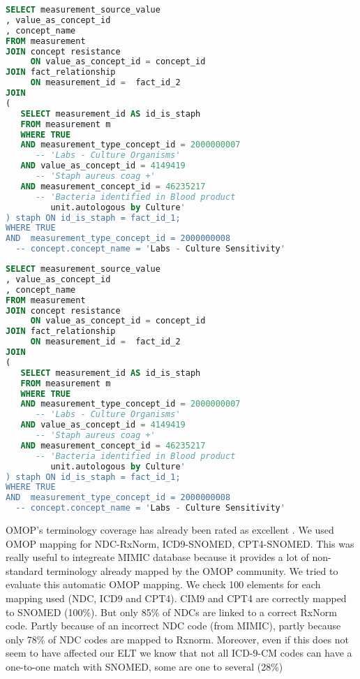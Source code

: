\begin{lstlisting}[language=sql,basicstyle=\scriptsize,caption=Original table microbiology SQL query,label={lst:original}]
SELECT measurement_source_value
, value_as_concept_id
, concept_name
FROM measurement
JOIN concept resistance 
     ON value_as_concept_id = concept_id
JOIN fact_relationship 
     ON measurement_id =  fact_id_2
JOIN
(
   SELECT measurement_id AS id_is_staph
   FROM measurement m
   WHERE TRUE 
   AND measurement_type_concept_id = 2000000007        			
      -- 'Labs - Culture Organisms'
   AND value_as_concept_id = 4149419                     			
      -- 'Staph aureus coag +' 
   AND measurement_concept_id = 46235217               			
      -- 'Bacteria identified in Blood product 
         unit.autologous by Culture'
) staph ON id_is_staph = fact_id_1;
WHERE TRUE
AND  measurement_type_concept_id = 2000000008        			        
  -- concept.concept_name = 'Labs - Culture Sensitivity'
\end{lstlisting}

\begin{lstlisting}[language=sql,basicstyle=\scriptsize,caption=Optimized table microbiology SQL query,label={lst:optimized}]
SELECT measurement_source_value
, value_as_concept_id
, concept_name
FROM measurement
JOIN concept resistance 
     ON value_as_concept_id = concept_id
JOIN fact_relationship 
     ON measurement_id =  fact_id_2
JOIN
(
   SELECT measurement_id AS id_is_staph
   FROM measurement m
   WHERE TRUE 
   AND measurement_type_concept_id = 2000000007        			
      -- 'Labs - Culture Organisms'
   AND value_as_concept_id = 4149419                     			
      -- 'Staph aureus coag +' 
   AND measurement_concept_id = 46235217               			
      -- 'Bacteria identified in Blood product 
         unit.autologous by Culture'
) staph ON id_is_staph = fact_id_1;
WHERE TRUE
AND  measurement_type_concept_id = 2000000008        			        
  -- concept.concept_name = 'Labs - Culture Sensitivity'
\end{lstlisting}

OMOP's terminology coverage has already been rated as excellent \cite{omop-vs-pcornet}. 
We used OMOP mapping for NDC-RxNorm, ICD9-SNOMED, CPT4-SNOMED. 
This was really useful to integreate MIMIC database because it provides a lot 
of non-standard terminology already mapped by the OMOP community. 
We tried to evaluate this automatic OMOP mapping. We check 100 elements for each 
mapping used (NDC, ICD9 and CPT4). CIM9 and CPT4 are correctly mapped to SNOMED 
(100\%). But only 85\% of NDCs are linked to a correct RxNorm code. 
Partly because of an incorrect NDC code (from MIMIC), partly because only 78\% 
of NDC codes are mapped to Rxnorm. Moreover, even if this does not seem to have 
affected our ELT we know that not all ICD-9-CM codes can have a one-to-one match 
with SNOMED, some are one to several (28\%) \cite{snomed-icd9}
 
